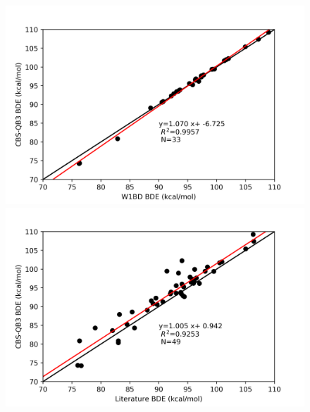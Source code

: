\begin{figure}
\centering
\begin{minipage}{8cm}
  \centering
  \includegraphics[width=\textwidth]{figures/w1bd-cbsqb3}
\end{minipage}%
\begin{minipage}{8cm}
  \centering
  \includegraphics[width=\textwidth]{figures/lit-cbsqb3}
\end{minipage}
\end{figure}


